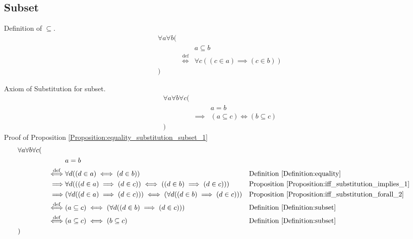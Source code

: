 \subsection{Subset}
\begin{defn}
\label{Definition:subset}
Definition of $\subseteq$.
\begin{align*}
& \forall a \forall b ( \\
& & & a \subseteq b \\
& & \overset{\operatorname{def}}{\iff} & \forall c ((c \in a) \implies (c \in b)) \\
& )
\end{align*}
\end{defn}

\begin{prop}
\label{Proposition:equality_substitution_subset_1}
Axiom of Substitution for subset.
\begin{align*}
& \forall a \forall b \forall c ( \\
& & & a = b \\
& & \implies & (a \subseteq c) \iff (b \subseteq c) \\
& )
\end{align*}
Proof of Proposition \ref{Proposition:equality_substitution_subset_1}
\begin{align*}
& \forall a \forall b \forall c ( \\
& & & a = b \\
& & \overset{\operatorname{def}}{\iff} & \forall d ((d \in a) \iff (d \in b))
& & \text{Definition \ref{Definition:equality}} \\
& & \implies & \forall d (((d \in a) \implies (d \in c)) \iff ((d \in b) \implies (d \in c)))
& & \text{Proposition \ref{Proposition:iff_substitution_implies_1}} \\
& & \implies & (\forall d ((d \in a) \implies (d \in c))) \iff (\forall d ((d \in b) \implies (d \in c)))
& & \text{Proposition \ref{Proposition:iff_substitution_forall_2}} \\
& & \overset{\operatorname{def}}{\iff} & (a \subseteq c) \iff (\forall d ((d \in b) \implies (d \in c)))
& & \text{Definition \ref{Definition:subset}} \\
& & \overset{\operatorname{def}}{\iff} & (a \subseteq c) \iff (b \subseteq c)
& & \text{Definition \ref{Definition:subset}} \\
& )
\end{align*}
\end{prop}


